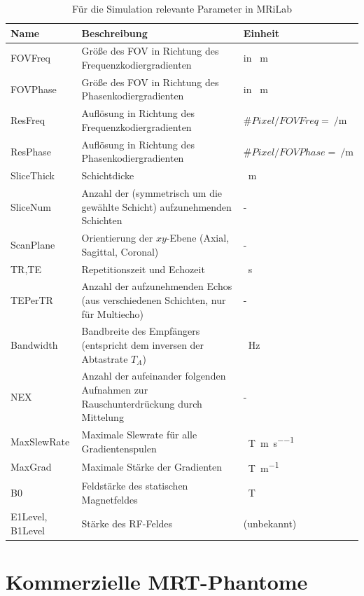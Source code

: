 \begin{table}[H]
	\caption{Für die Simulation relevante Parameter in MRiLab}
	\centering
	\begin{tabularx}{\textwidth}{l X l}
		\toprule
		\textbf{Name} & \textbf{Beschreibung} & \textbf{Einheit} \\
		\midrule
		FOVFreq & Größe des FOV in Richtung des Frequenzkodiergradienten & in \SI{}{\m}\\
		FOVPhase & Größe des FOV in Richtung des Phasenkodiergradienten & in \SI{}{\m}\\
		ResFreq & Auflösung in Richtung des Frequenzkodiergradienten & $\#Pixel/FOVFreq=\SI{}{\per\m}$\\
		ResPhase & Auflösung in Richtung des Phasenkodiergradienten & $\#Pixel/FOVPhase=\SI{}{\per\m}$\\
		SliceThick & Schichtdicke & \SI{}{\m}\\
		SliceNum & Anzahl der (symmetrisch um die gewählte Schicht) aufzunehmenden Schichten & - \\
		ScanPlane & Orientierung der $xy$-Ebene (Axial, Sagittal, Coronal) & - \\
		TR,TE & Repetitionszeit und Echozeit & \SI{}{\s}\\
		TEPerTR & Anzahl der aufzunehmenden Echos (aus verschiedenen Schichten, nur für Multiecho) & - \\
		Bandwidth & Bandbreite des Empfängers (entspricht dem inversen der Abtastrate $T_A$) & \SI{}{\hertz}\\
		NEX & Anzahl der aufeinander folgenden Aufnahmen zur Rauschunterdrückung durch Mittelung & - \\
		MaxSlewRate & Maximale Slewrate für alle Gradientenspulen & \SI{}{\tesla\per\m\per\s}\\
		MaxGrad & Maximale Stärke der Gradienten & \SI{}{\tesla\per\m}\\
		B0 & Feldstärke des statischen Magnetfeldes & \SI{}{\tesla}\\
		E1Level, B1Level & Stärke des RF-Feldes & (unbekannt)\\
		\bottomrule
	\end{tabularx}
	\label{tab:mriLabParam}
\end{table}


\section{Kommerzielle MRT-Phantome}

